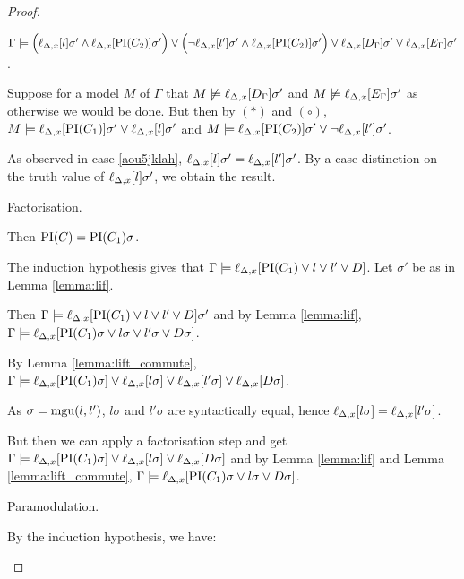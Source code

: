 \documentclass[,%
	paper=a4,%
	DIV14, 
	liststotoc,
	bibtotoc,
	draft=false,%
	numbers=noendperiod
]{scrartcl}
\newcommand{\lif}[1]{\lift{\Delta}{#1}{x}}
\begin{document}
\begin{proof}
\begin{description}
\begin{enumerate}
					$\Gamma \entails \Big(\lif{l}\sigma' \land \lif{\PI(C_2)}\sigma'\Big)\lor\Big(\lnot \lif{l'}\sigma' \land \lif{\PI(C_2)}\sigma'\Big)\lor\lif{D_\Gamma}\sigma' \lor \lif{E_\Gamma}\sigma'$.

					Suppose for a model $M$ of $\Gamma$ that  $M \notentails \lif{D_\Gamma}\sigma'$ and $M\notentails \lif{E_\Gamma}\sigma'$ as otherwise we would be done.
					But then by $(*)$ and $(\circ)$,
					$M \entails \lif{\PI(C_1)}\sigma' \lor \lif{l}\sigma'$ and
					$M \entails\nolinebreak \lif{\PI(C_2)}\sigma' \lor \lnot\lif{l'}\sigma'$.

					As observed in case \ref{aou5jklah}, $\lif{l}\sigma' = \lif{l'}\sigma'$. By a case distinction on the truth value of $\lif{l}\sigma'$, we obtain the result.



			\end{enumerate}

		\item{Factorisation.}
			\begin{prooftree}
			\end{prooftree}
			Then $\operatorname{PI}(C) = \operatorname{PI}(C_1)\sigma$.

			The induction hypothesis gives that
			$\Gamma \entails \lif{\PI(C_1) \lor l \lor l' \lor D}$.
			Let $\sigma'$ be as in Lemma \ref{lemma:lif}.

			Then $\Gamma \entails \lif{\PI(C_1) \lor l \lor l' \lor D}\sigma'$ and by Lemma \ref{lemma:lif},
			$\Gamma \entails \lif{\PI(C_1)\sigma \lor l\sigma \lor l'\sigma \lor D\sigma}$.

			By Lemma \ref{lemma:lift_commute},
			$\Gamma \entails \lif{\PI(C_1)\sigma} \lor \lif{l\sigma} \lor \lif{l'\sigma} \lor \lif{D\sigma}$.

			As $\sigma = \operatorname{mgu}(l, l')$, $l\sigma$ and $l'\sigma$ are syntactically equal, hence $\lif{l\sigma} = \lif{l'\sigma}$.%

			But then we can apply a factorisation step and get
			$\Gamma \entails \lif{\PI(C_1)\sigma} \lor \lif{l\sigma} \lor \lif{D\sigma}$ and by Lemma \ref{lemma:lif} and Lemma \ref{lemma:lift_commute}, 
			$\Gamma \entails\nolinebreak \lif{\PI(C_1)\sigma \lor l\sigma \lor D\sigma}$.



		\item{Paramodulation.}
			\begin{prooftree}
				\AxiomCm{C_1: D \lor s=t}
				\AxiomCm{C_2: E\occurat{r}{p}}
				\RightLabel{$\quad \sigma = \mgu(s, r)$}
				\BinaryInfCm{C: (D \lor E\occurat{t}{p})\sigma}
			\end{prooftree}
			By the induction hypothesis, we have:


\end{description}
\end{proof}
\end{document}

